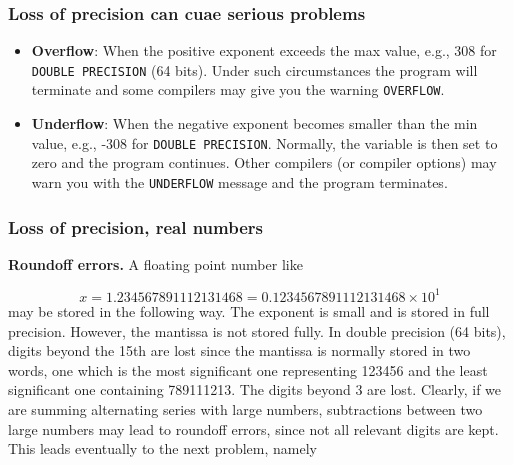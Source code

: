 \documentclass{beamer}
\newenvironment{block_mdfboxadmon}[1][]{\begin{block}{#1}}{\end{block}}
\begin{document}
\begin{frame}
\frametitle{Loss of precision can cuae serious problems}

\begin{block_mdfboxadmon}

\begin{itemize}
  \item \textbf{Overflow}: When the positive exponent exceeds the max value, e.g., 308 for \Verb!DOUBLE PRECISION! (64 bits). Under such circumstances the program will terminate and some compilers may give you the warning \Verb!OVERFLOW!.

  \item \textbf{Underflow}: When the negative exponent becomes smaller than the min value, e.g., -308 for \Verb!DOUBLE PRECISION!. Normally, the variable is then set to zero and the program continues. Other compilers (or compiler options) may warn you with the \Verb!UNDERFLOW! message and the program terminates.
\end{itemize}

\noindent
\end{block_mdfboxadmon}
\end{frame}

\begin{frame}
\frametitle{Loss of precision, real numbers}

\noindent\textbf{Roundoff errors.}
A floating point number like

\begin{equation}
   x= 1.234567891112131468 = 0.1234567891112131468\times 10^{1}
\end{equation}
may be stored in the following way. The exponent is  small
and is stored in full precision. However,
the mantissa is not stored fully. In double precision (64 bits), digits
beyond the
15th are lost since the mantissa is normally stored in two words,
one which is the most significant one representing
123456 and the least significant one containing 789111213. The digits
beyond 3 are lost. Clearly, if we are summing alternating series
with large numbers, subtractions between two large numbers may lead
to roundoff errors, since not all relevant digits are kept.
This leads eventually to the next problem, namely
\end{frame}
\end{document}
